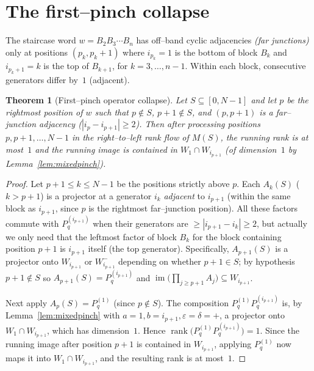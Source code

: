 \documentclass[11pt]{article}
\newtheorem{theorem}{Theorem}
\theoremstyle{definition}
\DeclareMathOperator{\rank}{rank}
\DeclareMathOperator{\im}{im}
\newcommand{\Pq}{P_{q}}
\newcommand{\W}{W}
\begin{document}
\section{The first--pinch collapse}

The staircase word $w=B_2B_3\cdots B_n$ has off--band cyclic adjacencies
\emph{(far junctions)} only at positions $(p_k,p_k+1)$ where $i_{p_k}=1$ is the
bottom of block $B_k$ and $i_{p_k+1}=k$ is the top of $B_{k+1}$, for
$k=3,\dots,n-1$. Within each block, consecutive generators differ by~$1$
(adjacent).

\begin{theorem}[First--pinch operator collapse]\label{thm:firstpinch}
Let $S\subseteq[0,N-1]$ and let $p$ be the rightmost position of $w$ such that
$p\notin S$, $p+1\notin S$, and $(p,p+1)$ is a far--junction adjacency
\textup{(}$|i_p-i_{p+1}|\ge2$\textup{)}. Then after processing positions
$p,p+1,\dots,N-1$ in the right--to--left rank flow of $M(S)$, the running
rank is at most~$1$ and the running image is contained in $\W_1\cap\W_{i_{p+1}}$
\textup{(}of dimension~$1$ by Lemma~\ref{lem:mixedpinch}\textup{)}.
\end{theorem}

\begin{proof}
Let $p+1\le k\le N-1$ be the positions strictly above $p$. Each
$A_k(S)$ ($k>p+1$) is a projector at a generator $i_k$ \emph{adjacent} to
$i_{p+1}$ (within the same block as $i_{p+1}$, since $p$ is the rightmost
far--junction position). All these factors commute with $\Pq^{(i_{p+1})}$ when
their generators are $\ge|i_{p+1}-i_k|\ge2$, but actually we only need that
the leftmost factor of block $B_{k}$ for the block containing position $p+1$
is $i_{p+1}$ itself (the top generator). Specifically, $A_{p+1}(S)$ is a
projector onto $\W_{i_{p+1}}$ or $\W_{i_{p+1}}^-$ depending on whether
$p+1\in S$; by hypothesis $p+1\notin S$ so $A_{p+1}(S)=\Pq^{(i_{p+1})}$ and
$\im\bigl(\prod_{j\ge p+1}A_j\bigr)\subseteq\W_{i_{p+1}}$.

Next apply $A_p(S)=\Pq^{(1)}$ (since $p\notin S$). The composition
$\Pq^{(1)}\Pq^{(i_{p+1})}$ is, by Lemma~\ref{lem:mixedpinch} with
$a=1,b=i_{p+1},\varepsilon=\delta=+$, a projector onto $\W_1\cap\W_{i_{p+1}}$,
which has dimension~$1$. Hence
$\rank\bigl(\Pq^{(1)}\Pq^{(i_{p+1})}\bigr)=1$. Since the running image after
position $p+1$ is contained in $\W_{i_{p+1}}$, applying $\Pq^{(1)}$ now maps it
into $\W_1\cap\W_{i_{p+1}}$, and the resulting rank is at most~$1$.
\end{proof}
\end{document}
